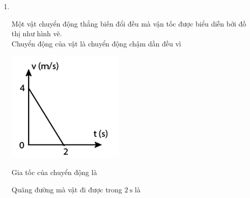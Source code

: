 \begin{enumerate}[label=\bfseries Câu \arabic*:]
	\item {}\\
	{\begin{minipage}[l]{0.7\textwidth}
			Một vật chuyển động thẳng biến đổi đều mà vận tốc được biểu diễn bởi đồ thị như hình vẽ.\\
			Chuyển động của vật là chuyển động chậm dần đều vì
		\end{minipage}
	\begin{minipage}{0.3\textwidth}
		\begin{center}
			\includegraphics[width=0.8\linewidth]{../figs/VN10-2023-PH-TP009-P-1}
		\end{center}
	\end{minipage}
Gia tốc của chuyển động là
Quãng đường mà vật đi được trong $\SI{2}{\second}$ là 
}


\end{enumerate}
